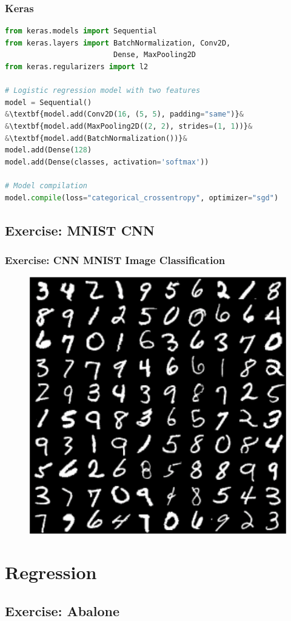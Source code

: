 \documentclass[aspectratio=169]{beamer}
\begin{document}
\begin{frame}[fragile]
\frametitle{Keras}

\begin{lstlisting}[language=Python]
from keras.models import Sequential
from keras.layers import BatchNormalization, Conv2D,
                         Dense, MaxPooling2D
from keras.regularizers import l2

# Logistic regression model with two features
model = Sequential()
&\textbf{model.add(Conv2D(16, (5, 5), padding="same")}&
&\textbf{model.add(MaxPooling2D((2, 2), strides=(1, 1))}&
&\textbf{model.add(BatchNormalization())}&
model.add(Dense(128)
model.add(Dense(classes, activation='softmax'))

# Model compilation
model.compile(loss="categorical_crossentropy", optimizer="sgd")
\end{lstlisting}

\end{frame}

\subsection{Exercise: MNIST CNN}
\label{subsec:cnn-exercise}

\begin{frame}
\frametitle{Exercise: CNN MNIST Image Classification}

\begin{figure}
    \centering
    \includegraphics[width=0.4\linewidth]{mnist.png}
\end{figure}
\end{frame}

\section{Regression}
\label{sec:regression}

\subsection{Exercise: Abalone}
\label{subsec:regression-exercise}
\end{document}
